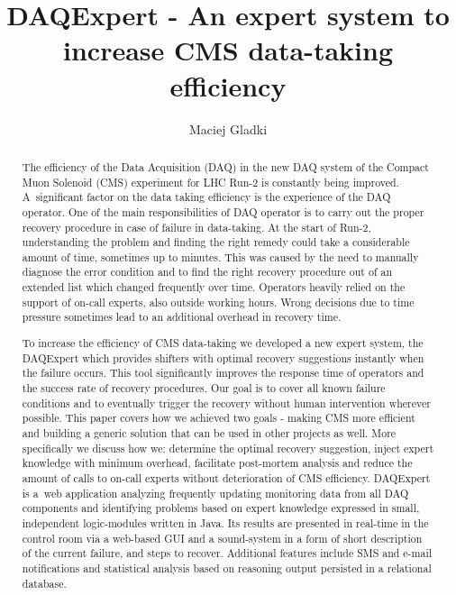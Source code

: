 \documentclass[a4paper]{jpconf}
\begin{document}
\title{DAQExpert - An expert system to increase CMS data-taking efficiency}

\author{Maciej Gladki}

\address{on behalf of the CMS Collaboration, CERN, Switzerland}


\begin{abstract}
The efficiency of the Data Acquisition (DAQ) in the new DAQ system of the Compact Muon Solenoid (CMS) experiment for LHC Run-2 is constantly being improved. A~significant factor on the data taking efficiency is the experience of the DAQ operator. One of the main responsibilities of DAQ operator is to carry out the proper recovery procedure in case of failure in data-taking. At the start of Run-2, understanding the problem and finding the right remedy could take a considerable amount of time, sometimes up to minutes. This was caused by the need to manually diagnose the error condition and to find the right recovery procedure out of an extended list which changed frequently over time. Operators heavily relied on the support of on-call experts, also outside working hours. Wrong decisions due to time pressure sometimes lead to an additional overhead in recovery time.

To increase the efficiency of CMS data-taking we developed a new expert system, the DAQExpert which provides shifters with optimal recovery suggestions instantly when the failure occurs. This tool significantly improves the response time of operators and the success rate of recovery procedures. Our goal is to cover all known failure conditions and to eventually trigger the recovery without human intervention wherever possible. This paper covers how we achieved two goals - making CMS more efficient and building a generic solution that can be used in other projects as well. More specifically we discuss how we: determine the optimal recovery suggestion, inject expert knowledge with minimum overhead, facilitate post-mortem analysis and reduce the amount of calls to on-call experts without deterioration of CMS efficiency. DAQExpert is a~web application analyzing frequently updating monitoring data from all DAQ components and identifying problems based on expert knowledge expressed in small, independent logic-modules written in Java. Its results are presented in real-time in the control room via a web-based GUI and a sound-system in a form of short description of the current failure, and steps to recover. Additional features include SMS and e-mail notifications and statistical analysis based on reasoning output persisted in a relational database.
\end{abstract}
\end{document}

